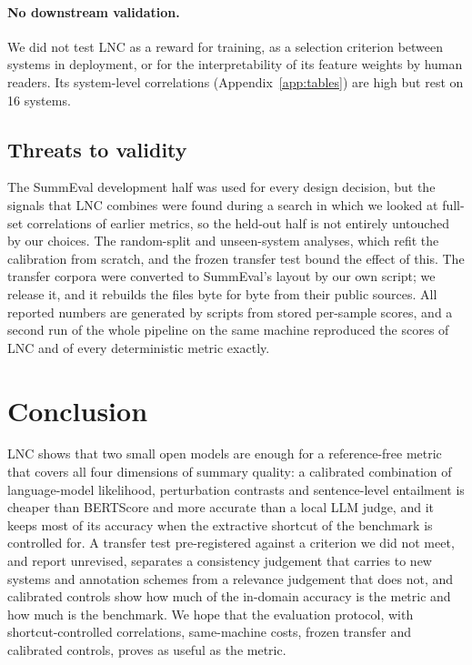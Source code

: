 \paragraph{No downstream validation.} We did not test LNC as a reward for training, as a selection criterion between systems in deployment, or for the interpretability of its feature weights by human readers. Its system-level correlations (Appendix~\ref{app:tables}) are high but rest on 16 systems.

\subsection{Threats to validity}

The SummEval development half was used for every design decision, but the signals that LNC combines were found during a search in which we looked at full-set correlations of earlier metrics, so the held-out half is not entirely untouched by our choices. The random-split and unseen-system analyses, which refit the calibration from scratch, and the frozen transfer test bound the effect of this. The transfer corpora were converted to SummEval's layout by our own script; we release it, and it rebuilds the files byte for byte from their public sources. All reported numbers are generated by scripts from stored per-sample scores, and a second run of the whole pipeline on the same machine reproduced the scores of LNC and of every deterministic metric exactly.

\section{Conclusion}
\label{sec:conclusion}

LNC shows that two small open models are enough for a reference-free metric that covers all four dimensions of summary quality: a calibrated combination of language-model likelihood, perturbation contrasts and sentence-level entailment is cheaper than BERTScore and more accurate than a local LLM judge, and it keeps most of its accuracy when the extractive shortcut of the benchmark is controlled for. A transfer test pre-registered against a criterion we did not meet, and report unrevised, separates a consistency judgement that carries to new systems and annotation schemes from a relevance judgement that does not, and calibrated controls show how much of the in-domain accuracy is the metric and how much is the benchmark. We hope that the evaluation protocol, with shortcut-controlled correlations, same-machine costs, frozen transfer and calibrated controls, proves as useful as the metric.

